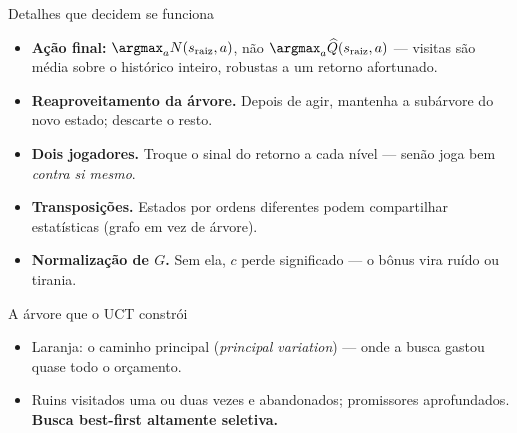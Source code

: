 \documentclass[aspectratio=169, 11pt]{beamer}
\newcommand{\Nv}[1]{N(#1)}                      %
\newcommand{\Qh}{\widehat{Q}}                   %
\newcommand{\ret}{G}                            %
\newcommand{\raiz}{s_{\mathrm{raiz}}}
\begin{document}
\begin{frame}{Detalhes que decidem se funciona}
  \begin{itemize}
    \item \textbf{Ação final:} $\argmax_a \Nv{\raiz,a}$, não $\argmax_a \Qh(\raiz,a)$ — visitas são média sobre o histórico inteiro, robustas a um retorno afortunado.
    \item \textbf{Reaproveitamento da árvore.} Depois de agir, mantenha a subárvore do novo estado; descarte o resto.
    \item \textbf{Dois jogadores.} Troque o sinal do retorno a cada nível — senão joga bem \emph{contra si mesmo}.
    \item \textbf{Transposições.} Estados por ordens diferentes podem compartilhar estatísticas (grafo em vez de árvore).
    \item \textbf{Normalização de $\ret$.} Sem ela, $c$ perde significado — o bônus vira ruído ou tirania.
  \end{itemize}
\end{frame}

\begin{frame}{A árvore que o UCT constrói}
  \centering

  \vfill
  \raggedright
  \begin{itemize}
    \item Laranja: o caminho principal (\emph{principal variation}) — onde a busca gastou quase todo o orçamento.
    \item Ruins visitados uma ou duas vezes e abandonados; promissores aprofundados. \textbf{Busca best-first altamente seletiva.}
  \end{itemize}
\end{frame}
\end{document}
